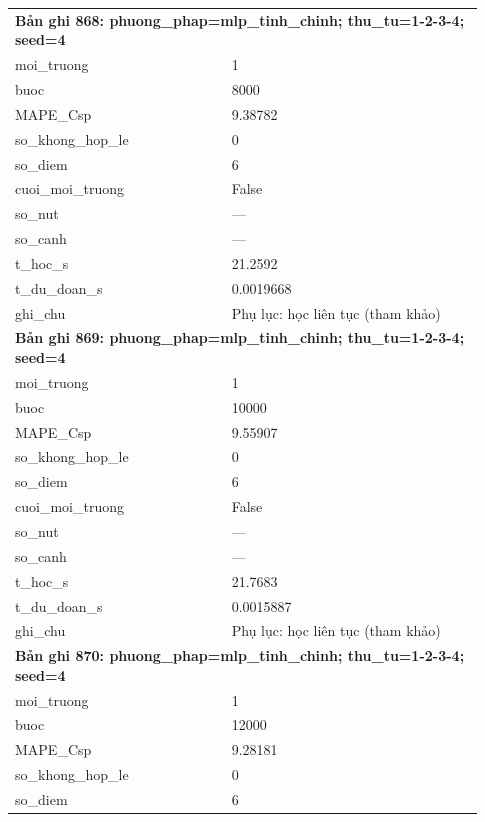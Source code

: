 \begin{longtable}{p{0.43\linewidth}p{0.50\linewidth}}
\midrule
\multicolumn{2}{p{0.95\linewidth}}{\textbf{Bản ghi 868: phuong\_phap=mlp\_tinh\_chinh; thu\_tu=1-2-3-4; seed=4}} \\
moi\_\allowbreak truong & 1 \\
buoc & 8000 \\
MAPE\_\allowbreak Csp & 9.38782 \\
so\_\allowbreak khong\_\allowbreak hop\_\allowbreak le & 0 \\
so\_\allowbreak diem & 6 \\
cuoi\_\allowbreak moi\_\allowbreak truong & False \\
so\_\allowbreak nut & — \\
so\_\allowbreak canh & — \\
t\_\allowbreak hoc\_\allowbreak s & 21.2592 \\
t\_\allowbreak du\_\allowbreak doan\_\allowbreak s & 0.0019668 \\
ghi\_\allowbreak chu & Phụ lục: học liên tục (tham khảo) \\
\midrule
\multicolumn{2}{p{0.95\linewidth}}{\textbf{Bản ghi 869: phuong\_phap=mlp\_tinh\_chinh; thu\_tu=1-2-3-4; seed=4}} \\
moi\_\allowbreak truong & 1 \\
buoc & 10000 \\
MAPE\_\allowbreak Csp & 9.55907 \\
so\_\allowbreak khong\_\allowbreak hop\_\allowbreak le & 0 \\
so\_\allowbreak diem & 6 \\
cuoi\_\allowbreak moi\_\allowbreak truong & False \\
so\_\allowbreak nut & — \\
so\_\allowbreak canh & — \\
t\_\allowbreak hoc\_\allowbreak s & 21.7683 \\
t\_\allowbreak du\_\allowbreak doan\_\allowbreak s & 0.0015887 \\
ghi\_\allowbreak chu & Phụ lục: học liên tục (tham khảo) \\
\midrule
\multicolumn{2}{p{0.95\linewidth}}{\textbf{Bản ghi 870: phuong\_phap=mlp\_tinh\_chinh; thu\_tu=1-2-3-4; seed=4}} \\
moi\_\allowbreak truong & 1 \\
buoc & 12000 \\
MAPE\_\allowbreak Csp & 9.28181 \\
so\_\allowbreak khong\_\allowbreak hop\_\allowbreak le & 0 \\
so\_\allowbreak diem & 6 \\

\end{longtable}

